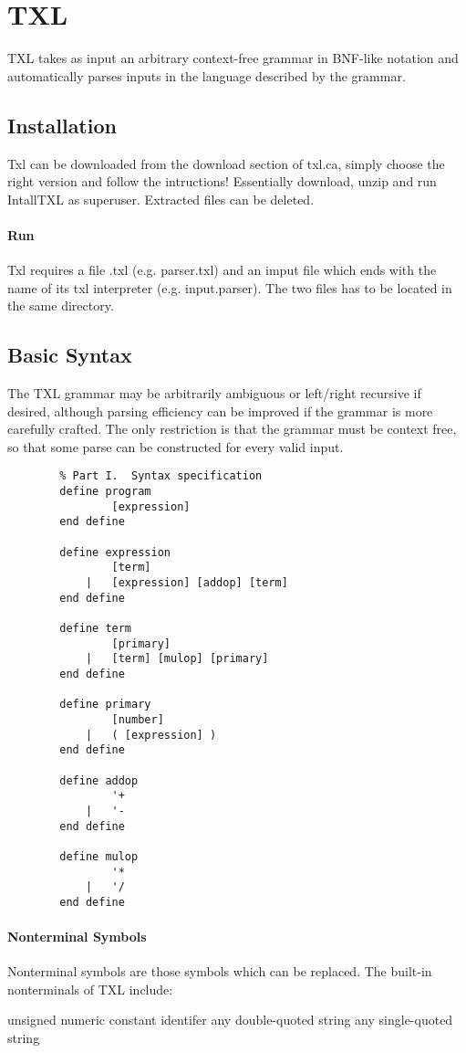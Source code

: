 \chapter{TXL}
	TXL takes as input an arbitrary context-free grammar in BNF-like notation and automatically parses inputs in the language described by the grammar.
	\cite{cordy2011excerpts}
	
	\section{Installation}
	Txl can be downloaded from the download section of txl.ca, simply choose the right version and follow the intructions! Essentially download, unzip and run IntallTXL as superuser. Extracted files can be deleted.
	\subsubsection{Run}
	Txl requires a file .txl (e.g. parser.txl) and an imput file which ends with the name of its txl interpreter (e.g. input.parser). The two files has to be located in the same directory.
	
	\section{Basic Syntax}
	The TXL grammar may be arbitrarily ambiguous or left/right recursive if desired, although parsing efficiency can be improved if the grammar is more carefully crafted. The only restriction is that the grammar must be context free, so that some parse can be constructed for every valid input.
	
	\begin{lstlisting}
		% Part I.  Syntax specification
		define program
			    [expression]
		end define 
			              
		define expression
			    [term]
			|   [expression] [addop] [term]
		end define 
			              
		define term
			    [primary]
			|   [term] [mulop] [primary]
		end define 
			              
		define primary
			    [number]
			|   ( [expression] )
		end define 
			              
		define addop
			    '+
			|   '-
		end define 
			              
		define mulop
			    '*
			|   '/
		end define 
	\end{lstlisting}
	
	\subsubsection{Nonterminal Symbols}
	Nonterminal symbols are those symbols which can be replaced. The built-in nonterminals of TXL include: 
	\begin{itemize}
		\itembf{[number]} unsigned numeric constant
		\itembf{[id]} identifer
		\itembf{[stringlit]} any double-quoted string
		\itembf{[charlit]} any single-quoted string
	\end{itemize}	

